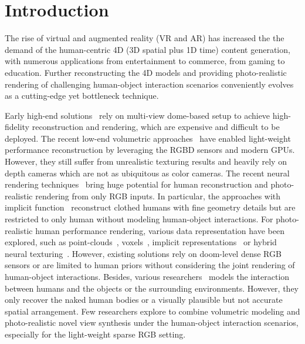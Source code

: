 \section{Introduction}

% 
The rise of virtual and augmented reality (VR and AR) has increased the
the demand of the human-centric 4D (3D spatial plus 1D time) content generation, with numerous applications from entertainment to commerce, from gaming to education.
%
Further reconstructing the 4D models and providing photo-realistic rendering of challenging human-object interaction scenarios conveniently evolves as a cutting-edge yet bottleneck technique.


Early high-end solutions~\cite{motion2fusion,TotalCapture,collet2015high,UnstructureLan} rely on multi-view dome-based setup to achieve high-fidelity reconstruction and rendering, which are expensive and difficult to be deployed.
%
The recent low-end volumetric approaches~\cite{UnstructureLan,robustfusion,su2021robustfusion,DoubleFusion,BodyFusion,tao2021function4d} have enabled light-weight performance reconstruction by leveraging the RGBD sensors and modern GPUs.
%
However, they still suffer from unrealistic texturing results and heavily rely on depth cameras which are not as ubiquitous as color cameras.
The recent neural rendering techniques~\cite{Wu_2020_CVPR,NeuralVolumes,nerf} bring huge potential for human reconstruction and photo-realistic rendering from only RGB inputs.
%
In particular, the approaches with implicit function~\cite{saito2019pifu,saito2020pifuhd,zheng2020pamir} reconstruct clothed humans with fine geometry details but are restricted to only human without modeling human-object interactions.
%
For photo-realistic human performance rendering, various data representation have been explored, such as point-clouds~\cite{Wu_2020_CVPR,pang2021fewshot}, voxels~\cite{NeuralVolumes}, implicit representations~\cite{nerf,peng2021neural,pumarola2020d,tretschk2020nonrigid} or hybrid neural texturing~\cite{NeuralHumanFVV2021CVPR}. 
%
However, existing solutions rely on doom-level dense RGB sensors or are limited to human priors without considering the joint rendering of human-object interactions.
Besides, various researchers~\cite{PSI2019,zhang2020object,2020phosa_Arrangements,PLACE:3DV:2020,HPS,Hassan:CVPR:2021,PatelCVPR2021,GRAB:2020} models the interaction between humans and the objects or the surrounding environments.
%
However, they only recover the naked human bodies or a visually plausible but not accurate spatial arrangement.
%
Few researchers explore to combine volumetric modeling and photo-realistic novel view synthesis under the human-object interaction scenarios, especially for the light-weight sparse RGB setting.


